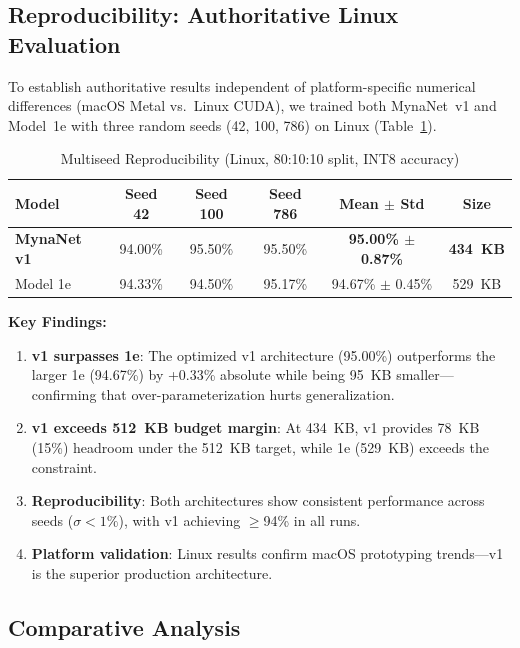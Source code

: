 \documentclass[conference]{IEEEtran}
\begin{document}
\subsection{Reproducibility: Authoritative Linux Evaluation}
\label{sec:reproducibility}

To establish authoritative results independent of platform-specific numerical differences (macOS Metal vs.\ Linux CUDA), we trained both MynaNet~v1 and Model~1e with three random seeds (42, 100, 786) on Linux (Table~\ref{tab:multiseed}).

\begin{table}[h]
\centering
\caption{Multiseed Reproducibility (Linux, 80:10:10 split, INT8 accuracy)}
\label{tab:multiseed}
\begin{tabular}{lccccc}
\toprule
\textbf{Model} & \textbf{Seed 42} & \textbf{Seed 100} & \textbf{Seed 786} & \textbf{Mean $\pm$ Std} & \textbf{Size} \\
\midrule
\textbf{MynaNet v1} & 94.00\% & 95.50\% & 95.50\% & \textbf{95.00\% $\pm$ 0.87\%} & \textbf{434~KB} \\
Model 1e & 94.33\% & 94.50\% & 95.17\% & 94.67\% $\pm$ 0.45\% & 529~KB \\
\bottomrule
\end{tabular}
\end{table}

\noindent\textbf{Key Findings:}
\begin{enumerate}
    \item \textbf{v1 surpasses 1e}: The optimized v1 architecture (95.00\%) outperforms the larger 1e (94.67\%) by +0.33\% absolute while being 95~KB smaller---confirming that over-parameterization hurts generalization.
    \item \textbf{v1 exceeds 512~KB budget margin}: At 434~KB, v1 provides 78~KB (15\%) headroom under the 512~KB target, while 1e (529~KB) exceeds the constraint.
    \item \textbf{Reproducibility}: Both architectures show consistent performance across seeds ($\sigma < 1\%$), with v1 achieving $\geq$94\% in all runs.
    \item \textbf{Platform validation}: Linux results confirm macOS prototyping trends---v1 is the superior production architecture.
\end{enumerate}

\subsection{Comparative Analysis}
\label{sec:comparison}
\end{document}
